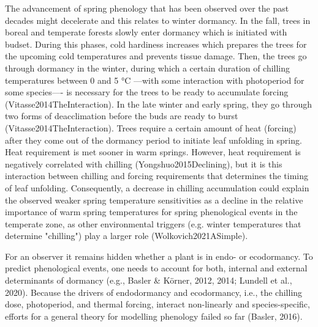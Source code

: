 \documentclass{article}
\begin{document}
The advancement of spring phenology that has been observed over the past decades might decelerate and this relates to winter dormancy. In the fall, trees in boreal and temperate forests slowly enter dormancy which is initiated with budset. During this phases, cold hardiness increases which prepares the trees for the upcoming cold temperatures and prevents tissue damage. Then, the trees go through dormancy in the winter, during which a certain duration of chilling temperatures between 0 and 5 °C ---with some interaction with photoperiod for some species---- is necessary for the trees to be ready to accumulate forcing (Vitasse2014TheInteraction). In the late winter and early spring, they go through two forms of deacclimation before the buds are ready to burst (Vitasse2014TheInteraction). Trees require a certain amount of heat (forcing) after they come out of the dormancy period to initiate leaf unfolding in spring. Heat requirement is met sooner in warm springs. However, heat requirement is negatively correlated with chilling (Yongshuo2015Declining), but it is this interaction between chilling and forcing requirements that determines the timing of leaf unfolding. Consequently, a decrease in chilling accumulation could explain the observed weaker spring temperature sensitivities as a decline in the relative importance of warm spring temperatures for spring phenological events in the temperate zone, as other environmental triggers (e.g. winter temperatures that determine "chilling") play a larger role (Wolkovich2021ASimple). 


For an observer it remains hidden whether a plant is in endo- or ecodormancy. To predict phenological events, one needs to account for both, internal and external determinants of dormancy (e.g., Basler \& Körner, 2012, 2014; Lundell et al., 2020). Because the drivers of endodormancy and ecodormancy, i.e., the chilling dose, photoperiod, and thermal forcing, interact non-linearly and species-specific, efforts for a general theory for modelling phenology failed so far (Basler, 2016).
\end{document}
